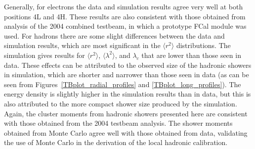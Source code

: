 %
%
%
%
%
%
%
%
%
%
%
%
%
%
%
%
%
%
%
%
%



%










Generally, for electrons the data and simulation results agree very well at both positions 4L and 4H. These results are also consistent with those obtained from analysis of the 2004 combined testbeam\cite{nim_tbp}, in which a prototype FCal module was used. For hadrons there are some slight differences between the data and simulation results, which are most significant in the $\langle r^2 \rangle$ distributions. The simulation gives results for $\langle r^2 \rangle$, $\langle \lambda^2 \rangle$, and $\lambda_c$ that are lower than those seen in data. These effects can be attributed to the observed size of the hadronic showers in simulation, which are shorter and narrower than those seen in data (as can be seen from Figures~\ref{TBplot_radial_profiles} and \ref{TBplot_long_profiles}). The energy density is slightly higher in the simulation results than in data, but this is also attributed to the more compact shower size produced by the simulation. Again, the cluster moments from hadronic showers presented here are consistent with those obtained from the 2004 testbeam analysis\cite{nim_tbp}. The shower moments obtained from Monte Carlo agree well with those obtained from data, validating the use of Monte Carlo in the derivation of the local hadronic calibration.

